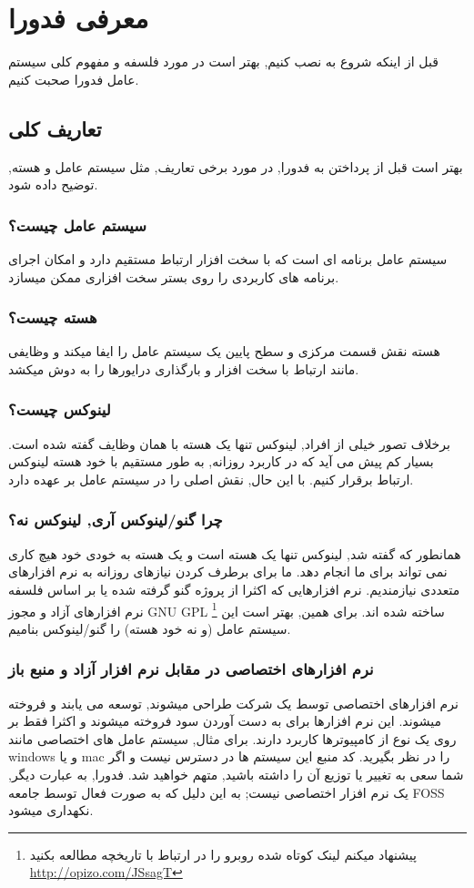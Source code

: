 \chapter{معرفی فدورا}\label{ch-1}
قبل از اینکه شروع به نصب کنیم, بهتر است در مورد فلسفه و مفهوم کلی سیستم عامل فدورا صحبت کنیم.\cite{ubuntu}
\section{تعاریف کلی}\label{se-11}
بهتر است قبل از پرداختن به فدورا, در مورد برخی تعاریف, مثل سیستم عامل و هسته, توضیح داده شود.
\subsection{سیستم عامل چیست؟}\label{se-111}
سیستم عامل برنامه ای است که با سخت افزار ارتباط مستقیم دارد و امکان اجرای برنامه های کاربردی را روی بستر سخت افزاری ممکن میسازد.
\subsection{هسته چیست؟}\label{se-112}
هسته نقش قسمت مرکزی و سطح پایین یک سیستم عامل را ایفا میکند و وظایفی مانند ارتباط با سخت افزار و بارگذاری درایورها را به دوش میکشد.
\subsection{لینوکس چیست؟}\label{se-113}
برخلاف تصور خیلی از افراد, لینوکس تنها یک هسته با همان وظایف گفته شده است. بسیار کم پیش می آید که در کاربرد روزانه, به طور مستقیم با خود هسته لینوکس ارتباط برقرار کنیم. با این حال, نقش اصلی را در سیستم عامل بر عهده دارد.
\subsection{چرا گنو/لینوکس آری, لینوکس نه؟}\label{se-114}
همانطور که گفته شد, لینوکس تنها یک هسته است و یک هسته به خودی خود هیچ کاری نمی تواند برای ما انجام دهد. ما برای برطرف کردن نیازهای روزانه به نرم افزارهای متعددی نیازمندیم. نرم افزارهایی که اکثرا از پروژه گنو گرفته شده یا بر اساس فلسفه نرم افزارهای آزاد و مجوز GNU GPL
\footnote{پیشنهاد میکنم لینک کوتاه شده روبرو را در ارتباط با تاریخچه مطالعه بکنید
\href{http://www.linuxfedora.ir/viewtopic.php?f=47&t=132}{http://opizo.com/JSsagT}
}
ساخته شده اند. برای همین, بهتر است این سیستم عامل (و نه خود هسته) را گنو/لینوکس بنامیم.
\subsection{نرم افزارهای اختصاصی در مقابل نرم افزار آزاد و منبع باز}\label{se-115}
نرم افزارهای اختصاصی توسط یک شرکت طراحی میشوند, توسعه می یابند و فروخته میشوند. این نرم افزارها برای به دست آوردن سود فروخته میشوند و اکثرا فقط بر روی یک نوع از کامپیوترها کاربرد دارند. برای مثال, سیستم عامل های اختصاصی مانند windows و یا mac را در نظر بگیرید. کد منبع این سیستم ها در دسترس نیست و اگر شما سعی به تغییر یا توزیع آن را داشته باشید, متهم خواهید شد.
فدورا, به عبارت دیگر, یک نرم افزار اختصاصی نیست; به این دلیل که به صورت فعال توسط جامعه FOSS نکهداری میشود.
